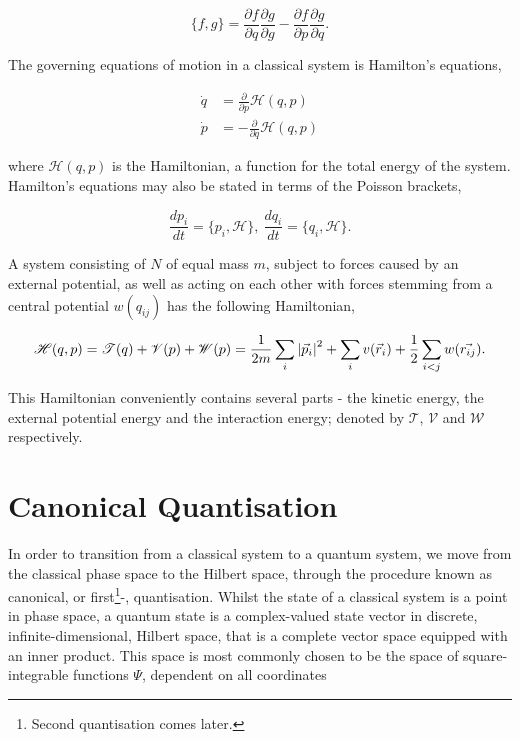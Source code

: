     \begin{equation}
        \label{eq:poisson_bracket}
        \{f, g\} = \frac{\partial f}{\partial q} \frac{\partial g}{\partial g}
        - \frac{\partial f}{\partial p} \frac{\partial g}{\partial q}.
    \end{equation}

    The governing equations of motion in a classical system is Hamilton's equations,

    \begin{align}
        \dot{q} &= \frac{\partial}{\partial p} \mathscr{H}(q, p) \\
        \dot{p} &= -\frac{\partial}{\partial q} \mathscr{H}(q, p)
    \end{align}

    where $\mathscr{H}(q, p)$ is the Hamiltonian, a function for the total energy of the
    system. Hamilton's equations may also be stated in terms of the Poisson brackets,

    \begin{equation}
        \frac{dp_i}{dt} = \{p_i, \mathscr{H}\}, \ \frac{dq_i}{dt} = \{q_i, \mathscr{H}\}.
    \end{equation}

    A system consisting of $N$ of equal mass $m$, subject to forces caused by an external
    potential, as well as acting on each other with forces stemming from a central
    potential $w(q_{ij})$ has the following Hamiltonian,

    \begin{equation}
        \mathscr{H}(q, p) = \mathscr{T}(q) + \mathscr{V}(p) + \mathscr{W}(p) 
            = \frac{1}{2m}\sum_{i} \abs{\vec{p}_i}^2 + \sum_{i} v(\vec{r}_i)
                + \frac{1}{2}\sum_{i<j} w(\vec{r_{ij}}).
    \end{equation}

    This Hamiltonian conveniently contains several parts - the kinetic energy, the
    external potential energy and the interaction energy; denoted by $\mathscr{T}$,
    $\mathscr{V}$ and $\mathscr{W}$ respectively.

\section{Canonical Quantisation}

    In order to transition from a classical system to a quantum system, we move from 
    the classical phase space to the Hilbert space, through the procedure known as 
    canonical, or first\footnote{Second quantisation comes later.}-, quantisation.
    Whilst the state of a classical system is a point in phase space, a quantum state
    is a complex-valued state vector in discrete, infinite-dimensional, Hilbert space,
    that is a complete vector space equipped with an inner product. This space
    is most commonly chosen to be the space of square-integrable functions $\Psi$,
    dependent on all coordinates
    
